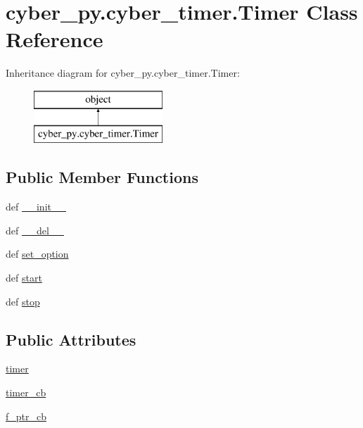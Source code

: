 \hypertarget{classcyber__py_1_1cyber__timer_1_1Timer}{\section{cyber\-\_\-py.\-cyber\-\_\-timer.\-Timer Class Reference}
\label{classcyber__py_1_1cyber__timer_1_1Timer}
}
Inheritance diagram for cyber\-\_\-py.\-cyber\-\_\-timer.\-Timer\-:\begin{figure}[H]
\begin{center}
\leavevmode
\includegraphics[height=2.000000cm]{classcyber__py_1_1cyber__timer_1_1Timer}
\end{center}
\end{figure}
\subsection*{Public Member Functions}
\begin{DoxyCompactItemize}
\item 
def \hyperlink{classcyber__py_1_1cyber__timer_1_1Timer_ad8c0267e9f4833c0adc21ad6f4769c77}{\-\_\-\-\_\-init\-\_\-\-\_\-}
\item 
def \hyperlink{classcyber__py_1_1cyber__timer_1_1Timer_a26e22ab1e79b079b021357c24c25d018}{\-\_\-\-\_\-del\-\_\-\-\_\-}
\item 
def \hyperlink{classcyber__py_1_1cyber__timer_1_1Timer_a68ec829dc37bfd878a96674964e80a14}{set\-\_\-option}
\item 
def \hyperlink{classcyber__py_1_1cyber__timer_1_1Timer_a8cb7bd524d4a9162ef3cbc664dc14c44}{start}
\item 
def \hyperlink{classcyber__py_1_1cyber__timer_1_1Timer_a7ae0beb18d25bf342224f51753c92939}{stop}
\end{DoxyCompactItemize}
\subsection*{Public Attributes}
\begin{DoxyCompactItemize}
\item 
\hyperlink{classcyber__py_1_1cyber__timer_1_1Timer_ab6eced17f6b54dbead937056a3e11def}{timer}
\item 
\hyperlink{classcyber__py_1_1cyber__timer_1_1Timer_a12707e11d95087467579b69228e0bfbe}{timer\-\_\-cb}
\item 
\hyperlink{classcyber__py_1_1cyber__timer_1_1Timer_a097dc3bac9a12163355d050d51dfb31b}{f\-\_\-ptr\-\_\-cb}
\end{DoxyCompactItemize}


